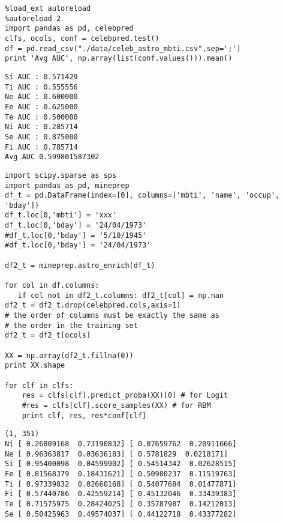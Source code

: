 \documentclass[12pt,fleqn]{article}\usepackage{../common}
\begin{document}
\begin{verbatim}
%load_ext autoreload
%autoreload 2
import pandas as pd, celebpred
clfs, ocols, conf = celebpred.test()
df = pd.read_csv("./data/celeb_astro_mbti.csv",sep=';')
print 'Avg AUC', np.array(list(conf.values())).mean()
\end{verbatim}

\begin{verbatim}
Si AUC : 0.571429
Ti AUC : 0.555556
Ne AUC : 0.600000
Fe AUC : 0.625000
Te AUC : 0.500000
Ni AUC : 0.285714
Se AUC : 0.875000
Fi AUC : 0.785714
Avg AUC 0.599801587302
\end{verbatim}

\begin{verbatim}
import scipy.sparse as sps
import pandas as pd, mineprep
df_t = pd.DataFrame(index=[0], columns=['mbti', 'name', 'occup', 'bday'])
df_t.loc[0,'mbti'] = 'xxx'
df_t.loc[0,'bday'] = '24/04/1973'
#df_t.loc[0,'bday'] = '5/10/1945'
#df_t.loc[0,'bday'] = '24/04/1973'

df2_t = mineprep.astro_enrich(df_t)

for col in df.columns: 
   if col not in df2_t.columns: df2_t[col] = np.nan
df2_t = df2_t.drop(celebpred.cols,axis=1)
# the order of columns must be exactly the same as 
# the order in the training set
df2_t = df2_t[ocols] 

XX = np.array(df2_t.fillna(0))
print XX.shape

for clf in clfs: 
    res = clfs[clf].predict_proba(XX)[0] # for Logit
    #res = clfs[clf].score_samples(XX) # for RBM
    print clf, res, res*conf[clf]
\end{verbatim}

\begin{verbatim}
(1, 351)
Ni [ 0.26809168  0.73190832] [ 0.07659762  0.20911666]
Ne [ 0.96363817  0.03636183] [ 0.5781829  0.0218171]
Si [ 0.95400098  0.04599902] [ 0.54514342  0.02628515]
Fe [ 0.81568379  0.18431621] [ 0.50980237  0.11519763]
Ti [ 0.97339832  0.02660168] [ 0.54077684  0.01477871]
Fi [ 0.57440786  0.42559214] [ 0.45132046  0.33439383]
Te [ 0.71575975  0.28424025] [ 0.35787987  0.14212013]
Se [ 0.50425963  0.49574037] [ 0.44122718  0.43377282]
\end{verbatim}
\end{document}
